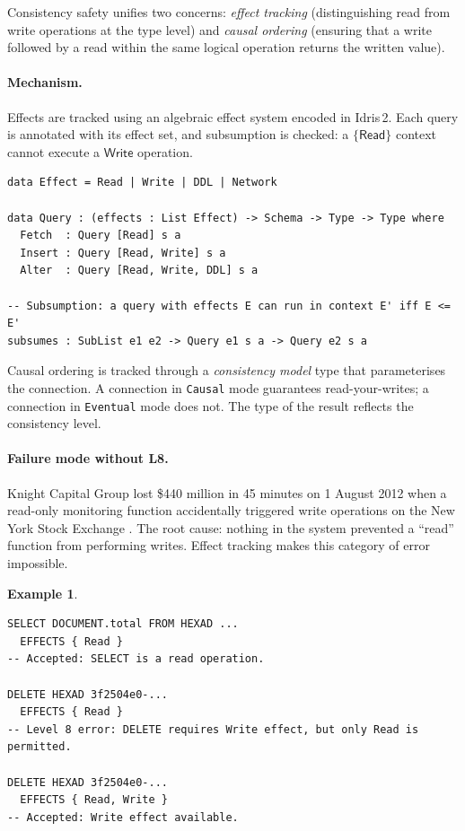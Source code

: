 \documentclass[11pt,a4paper]{article}
\newtheorem{example}[theorem]{Example}
\newcommand{\LevelN}[1]{\textsf{L#1}}
\begin{document}
Consistency safety unifies two concerns: \emph{effect tracking}
(distinguishing read from write operations at the type level) and
\emph{causal ordering} (ensuring that a write followed by a read within
the same logical operation returns the written value).

\paragraph{Mechanism.}
Effects are tracked using an algebraic effect system encoded in Idris\,2.
Each query is annotated with its effect set, and subsumption is checked:
a $\{\mathsf{Read}\}$ context cannot execute a $\mathsf{Write}$
operation.

\begin{lstlisting}[language=Idris2]
data Effect = Read | Write | DDL | Network

data Query : (effects : List Effect) -> Schema -> Type -> Type where
  Fetch  : Query [Read] s a
  Insert : Query [Read, Write] s a
  Alter  : Query [Read, Write, DDL] s a

-- Subsumption: a query with effects E can run in context E' iff E <= E'
subsumes : SubList e1 e2 -> Query e1 s a -> Query e2 s a
\end{lstlisting}

Causal ordering is tracked through a \emph{consistency model} type that
parameterises the connection.  A connection in \texttt{Causal} mode
guarantees read-your-writes; a connection in \texttt{Eventual} mode
does not.  The type of the result reflects the consistency level.

\paragraph{Failure mode without \LevelN{8}.}
Knight Capital Group lost \$440 million in 45 minutes on 1 August 2012
when a read-only monitoring function accidentally triggered write
operations on the New York Stock Exchange \citep{sec2013knight}.  The
root cause: nothing in the system prevented a ``read'' function from
performing writes.  Effect tracking makes this category of error
impossible.

\begin{example}
\begin{lstlisting}[language=VQL]
SELECT DOCUMENT.total FROM HEXAD ...
  EFFECTS { Read }
-- Accepted: SELECT is a read operation.

DELETE HEXAD 3f2504e0-...
  EFFECTS { Read }
-- Level 8 error: DELETE requires Write effect, but only Read is permitted.

DELETE HEXAD 3f2504e0-...
  EFFECTS { Read, Write }
-- Accepted: Write effect available.
\end{lstlisting}
\end{example}
\end{document}
